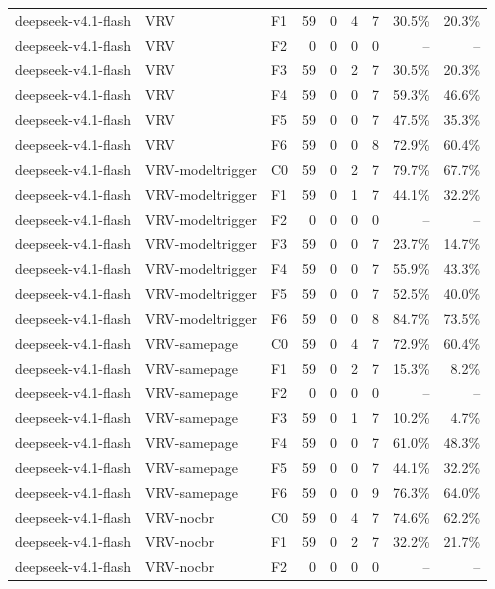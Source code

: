 \begin{tabular}{lllrrrrrr}
deepseek-v4.1-flash & VRV & F1 & 59 & 0 & 4 & 7 & 30.5\% & 20.3\% \\
deepseek-v4.1-flash & VRV & F2 & 0 & 0 & 0 & 0 & -- & -- \\
deepseek-v4.1-flash & VRV & F3 & 59 & 0 & 2 & 7 & 30.5\% & 20.3\% \\
deepseek-v4.1-flash & VRV & F4 & 59 & 0 & 0 & 7 & 59.3\% & 46.6\% \\
deepseek-v4.1-flash & VRV & F5 & 59 & 0 & 0 & 7 & 47.5\% & 35.3\% \\
deepseek-v4.1-flash & VRV & F6 & 59 & 0 & 0 & 8 & 72.9\% & 60.4\% \\
deepseek-v4.1-flash & VRV-modeltrigger & C0 & 59 & 0 & 2 & 7 & 79.7\% & 67.7\% \\
deepseek-v4.1-flash & VRV-modeltrigger & F1 & 59 & 0 & 1 & 7 & 44.1\% & 32.2\% \\
deepseek-v4.1-flash & VRV-modeltrigger & F2 & 0 & 0 & 0 & 0 & -- & -- \\
deepseek-v4.1-flash & VRV-modeltrigger & F3 & 59 & 0 & 0 & 7 & 23.7\% & 14.7\% \\
deepseek-v4.1-flash & VRV-modeltrigger & F4 & 59 & 0 & 0 & 7 & 55.9\% & 43.3\% \\
deepseek-v4.1-flash & VRV-modeltrigger & F5 & 59 & 0 & 0 & 7 & 52.5\% & 40.0\% \\
deepseek-v4.1-flash & VRV-modeltrigger & F6 & 59 & 0 & 0 & 8 & 84.7\% & 73.5\% \\
deepseek-v4.1-flash & VRV-samepage & C0 & 59 & 0 & 4 & 7 & 72.9\% & 60.4\% \\
deepseek-v4.1-flash & VRV-samepage & F1 & 59 & 0 & 2 & 7 & 15.3\% & 8.2\% \\
deepseek-v4.1-flash & VRV-samepage & F2 & 0 & 0 & 0 & 0 & -- & -- \\
deepseek-v4.1-flash & VRV-samepage & F3 & 59 & 0 & 1 & 7 & 10.2\% & 4.7\% \\
deepseek-v4.1-flash & VRV-samepage & F4 & 59 & 0 & 0 & 7 & 61.0\% & 48.3\% \\
deepseek-v4.1-flash & VRV-samepage & F5 & 59 & 0 & 0 & 7 & 44.1\% & 32.2\% \\
deepseek-v4.1-flash & VRV-samepage & F6 & 59 & 0 & 0 & 9 & 76.3\% & 64.0\% \\
deepseek-v4.1-flash & VRV-nocbr & C0 & 59 & 0 & 4 & 7 & 74.6\% & 62.2\% \\
deepseek-v4.1-flash & VRV-nocbr & F1 & 59 & 0 & 2 & 7 & 32.2\% & 21.7\% \\
deepseek-v4.1-flash & VRV-nocbr & F2 & 0 & 0 & 0 & 0 & -- & -- \\

\end{tabular}
